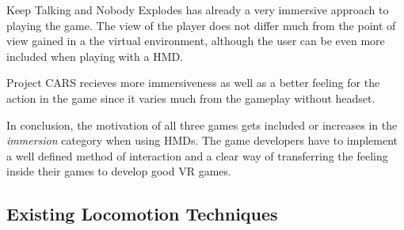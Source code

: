 Keep Talking and Nobody Explodes has already a very immersive approach to playing the game. The view of the player does not differ much from the point of view gained in a the virtual environment, although the user can be even more included when playing with a HMD.

Project CARS recieves more immersiveness as well as a better feeling for the action in the game since it varies much from the gameplay without headset. 

In conclusion, the motivation of all three games gets included or increases in the \textit{immersion} category when using HMDs. The game developers have to implement a well defined method of interaction and a clear way of transferring the feeling inside their games to develop good VR games. 

%
%
%
%

\subsection{Existing Locomotion Techniques}
\label{sec:exLocomotion}

